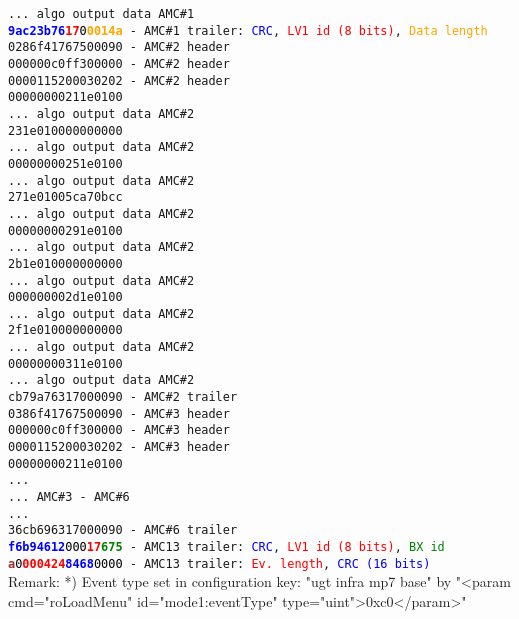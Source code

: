 \texttt{... algo output data AMC\#1}\\
\texttt{\textcolor{blue}{\textbf{9ac23b76}}\textcolor{red}{\textbf{17}}\textcolor{black}{0}\textcolor{orange}{\textbf{0014a}} - AMC\#1 trailer: \textcolor{blue}{CRC}, \textcolor{red}{LV1 id (8 bits)}, \textcolor{orange}{Data length}}\\
\texttt{0286f41767500090 - AMC\#2 header} \\
\texttt{000000c0ff300000 - AMC\#2 header} \\
\texttt{0000115200030202 - AMC\#2 header} \\
\texttt{00000000211e0100}\\
\texttt{... algo output data AMC\#2}\\
\texttt{231e010000000000}\\
\texttt{... algo output data AMC\#2}\\
\texttt{00000000251e0100}\\
\texttt{... algo output data AMC\#2}\\
\texttt{271e01005ca70bcc}\\
\texttt{... algo output data AMC\#2}\\
\texttt{00000000291e0100}\\
\texttt{... algo output data AMC\#2}\\
\texttt{2b1e010000000000}\\
\texttt{... algo output data AMC\#2}\\
\texttt{000000002d1e0100}\\
\texttt{... algo output data AMC\#2}\\
\texttt{2f1e010000000000}\\
\texttt{... algo output data AMC\#2}\\
\texttt{00000000311e0100}\\
\texttt{... algo output data AMC\#2}\\
\texttt{cb79a76317000090 - AMC\#2 trailer}\\
\texttt{0386f41767500090 - AMC\#3 header}\\
\texttt{000000c0ff300000 - AMC\#3 header}\\
\texttt{0000115200030202 - AMC\#3 header}\\
\texttt{00000000211e0100}\\
\texttt{...}\\
\texttt{... AMC\#3 - AMC\#6}\\
\texttt{...}\\
\texttt{36cb696317000090 - AMC\#6 trailer}\\
\texttt{\textcolor{blue}{\textbf{f6b94612}}\textcolor{black}{000}\textcolor{red}{\textbf{17}}\textcolor{green}{\textbf{675}} - AMC13 trailer: \textcolor{blue}{CRC}, \textcolor{red}{LV1 id (8 bits)}, \textcolor{green}{BX id}}\\
\texttt{\textcolor{brown}{\textbf{a}}\textcolor{black}{0}\textcolor{red}{\textbf{000424}}\textcolor{blue}{\textbf{8468}}\textcolor{black}{0000} - AMC13 trailer: \textcolor{red}{Ev. length}, \textcolor{blue}{CRC (16 bits)}}\\

Remark:
*) Event type set in configuration key: "ugt infra mp7 base" by "<param cmd="roLoadMenu" id="mode1:eventType" type="uint">0xc0</param>"
